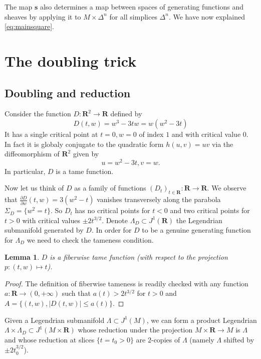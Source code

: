 \documentclass[12pt,a4paper]{article}
\numberwithin{equation}{section}
\newtheorem{lem}[equation]{Lemma}
\theoremstyle{definition}
\theoremstyle{remark}
\newcommand{\R}{\mathbf{R}}
\newcommand{\del}{\partial}
\begin{document}
The map $\mathbf{s}$ also determines a map between spaces of generating functions and sheaves by applying it to $M \times \Delta^n$ for all simplices $\Delta^n$.   We have now explained \eqref{eq:mainsquare}.





\section{The doubling trick}\label{sec:doubling}



\subsection{Doubling and reduction}\label{gen fn doubling}

Consider the function $D:\R^2\to \R$ defined by
\[D(t,w)=w^3-3tw=w(w^2-3t)\]
It has a single critical point at $t=0, w=0$ of index $1$ and with critical value $0$.
In fact it is globaly conjugate to the quadratic form $h(u,v)=uv$ via the diffeomorphism of $\R^2$
given by
\[u=w^2-3t, v=w.\]
In particular, $D$ is a tame function.

Now let us think of $D$ as a family of functions $(D_t)_{t\in\R}:\R\to \R$. We observe that $\frac{\del D}{\del w}(t,w)=3(w^2-t)$ vanishes transversely
along the parabola $\Sigma_D=\{w^2=t\}$. So $D_t$ has no critical points for $t<0$
and two critical points for $t>0$ with critical values $\pm 2 t^{3/2}$. Denote $\Lambda_D \subset J^1(\R)$
the Legendrian submanifold generated by $D$. In order for $D$ to be a genuine generating function for $\Lambda_D$
we need to check the tameness condition.
\begin{lem}
$D$ is a fiberwise tame function (with respect to the projection $p:(t,w)\mapsto t$).
\end{lem}
\begin{proof}
The definition of fiberwise tameness is readily checked with any function $a:\R\to (0,+\infty)$ such that $a(t)>2t^{3/2}$ for $t>0$ and $A=\{(t,w), |D(t,w)|\leq a(t)\}$.
\end{proof}

Given a Legendrian submanifold $\Lambda\subset J^1(M)$, we can form a product Legendrian
$\Lambda\times \Lambda_D\subset J^1(M\times \R)$ whose reduction under the projection $M\times \R\to M$
is $\Lambda$ and whose reduction at slices $\{t=t_0>0\}$ are $2$-copies of $\Lambda$ (namely $\Lambda$ shifted by $\pm 2t_0^{3/2}$).
\end{document}

